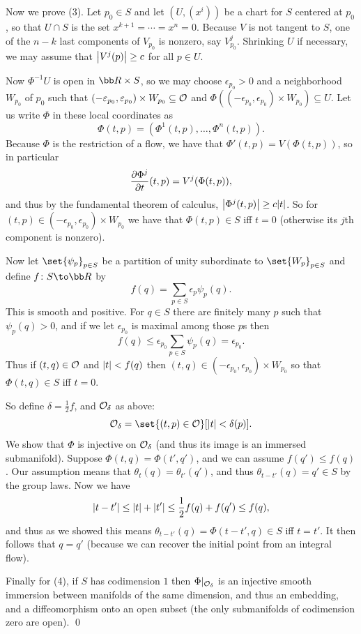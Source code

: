     Now we prove (3).
    Let $p_0\in S$ and let $(U,(x^i))$ be a chart for $S$ centered at $p_0$, so that $U\cap S$ is the set $x^{k+1}=\cdots=x^n=0$.
    Because $V$ is not tangent to $S$, one of the $n-k$ last components of $V_{p_0}$ is nonzero, say $V^j_{p_0}$.
    Shrinking $U$ if necessary, we may assume that $\mathopen{}\mathclose{\left|V^j(p)\right|}\geq c$ for all $p\in U$.

    Now $\Phi^{-1}U$ is open in $\bR\times S$, so we may choose $\epsilon_{p_0}>0$ and a neighborhood $W_{p_0}$ of $p_0$ such that
    $(-\varepsilon_{p_0},\varepsilon_{p_0})\times W_{p_0}\subseteq{{\cal O}}$ and $\Phi((-\epsilon_{p_0},\epsilon_{p_0})\times W_{p_0})\subseteq U$.
    Let us write $\Phi$ in these local coordinates as
    $$ \Phi(t,p) = (\Phi^1(t,p),\dots,\Phi^n(t,p)) . $$
    Because $\Phi$ is the restriction of a flow, we have that $\Phi'(t,p)=V(\Phi(t,p))$, so in particular
    $$ {{\partial \Phi^j}\over{\partial t}}(t,p) = V^j(\Phi(t,p)), $$
    and thus by the fundamental theorem of calculus, $\mathopen{}\mathclose{\left|\Phi^j(t,p)\right|}\geq c\mathopen{}\mathclose{\left|t\right|}$.
    So for $(t,p)\in(-\epsilon_{p_0},\epsilon_{p_0})\times W_{p_0}$ we have that $\Phi(t,p)\in S$ iff $t=0$ (otherwise its $j$th component is nonzero).

    Now let $\set{\psi_p}_{p\in S}$ be a partition of unity subordinate to $\set{W_p}_{p\in S}$ and define $f\colon S\to\bR$ by
    $$ f(q) = \sum_{p\in S}\epsilon_p\psi_p(q) . $$
    This is smooth and positive.
    For $q\in S$ there are finitely many $p$ such that $\psi_p(q)>0$, and if we let $\epsilon_{p_0}$ is maximal among those $p$s then
    $$ f(q) \leq \epsilon_{p_0}\sum_{p\in S}\psi_p(q) = \epsilon_{p_0} . $$
    Thus if $(t,q)\in{{\cal O}}$ and $\mathopen{}\mathclose{\left|t\right|}<f(q)$ then $(t,q)\in(-\epsilon_{p_0},\epsilon_{p_0})\times W_{p_0}$ so that $\Phi(t,q)\in S$ iff $t=0$.

    So define $\delta=\frac12f$, and ${{\cal O}}_\delta$ as above:
    $$ \O_\delta = \set{(t,p)\in\O}[\abs t<\delta(p)] . $$
    We show that $\Phi$ is injective on ${{\cal O}}_\delta$ (and thus its image is an immersed submanifold).
    Suppose $\Phi(t,q)=\Phi(t',q')$, and we can assume $f(q')\leq f(q)$.
    Our assumption means that $\theta_t(q)=\theta_{t'}(q')$, and thus $\theta_{t-t'}(q)=q'\in S$ by the group laws.
    Now we have
    $$ \mathopen{}\mathclose{\left|t-t'\right|} \leq \mathopen{}\mathclose{\left|t\right|} + \mathopen{}\mathclose{\left|t'\right|} \leq {{1}\over{2}}{f(q)+f(q')} \leq f(q) , $$
    and thus as we showed this means $\theta_{t-t'}(q)=\Phi(t-t',q)\in S$ iff $t=t'$.
    It then follows that $q=q'$ (because we can recover the initial point from an integral flow).

    Finally for (4), if $S$ has codimension $1$ then $\Phi|_{{{\cal O}}_\delta}$ is an injective smooth immersion between manifolds of the same dimension, and thus an
    embedding, and a diffeomorphism onto an open subset (the only submanifolds of codimension zero are open).
    \qed

